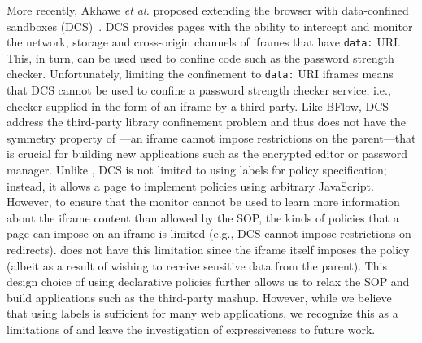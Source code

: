 More recently, Akhawe \emph{et al.} proposed extending the browser
with data-confined sandboxes (DCS)~\cite{Akhawe2013}.
%
DCS provides pages with the ability to intercept and monitor the
network, storage and cross-origin channels of iframes that have
\verb|data:| URI.
%
This, in turn, can be used used to confine code such as the password
strength checker.
%
Unfortunately, limiting the confinement to \verb|data:| URI iframes
means that DCS cannot be used to confine a password strength checker
service, i.e., checker supplied in the form of an iframe by a
third-party.
%
Like BFlow, DCS address the third-party library confinement problem
and thus does not have the symmetry property of \sys{}---an iframe
cannot impose restrictions on the parent---that is crucial for
building new applications such as the encrypted editor or password
manager.
%
Unlike \sys{}, DCS is not limited to using labels for policy
specification; instead, it allows a page to implement policies using
arbitrary JavaScript.
%
However, to ensure that the monitor cannot be used to learn more
information about the iframe content than allowed by the SOP, the
kinds of policies that a page can impose on an iframe is limited
(e.g., DCS cannot impose restrictions on redirects).
%
\sys{} does not have this limitation since the iframe itself imposes
the policy (albeit as a result of wishing to receive sensitive data
from the parent).
%
This design choice of using declarative policies further allows us to
relax the SOP and build applications such as the third-party mashup.
%
However, while we believe that using labels is sufficient for many
web applications, we recognize this as a limitations of \sys{} and
leave the investigation of expressiveness to future work.




